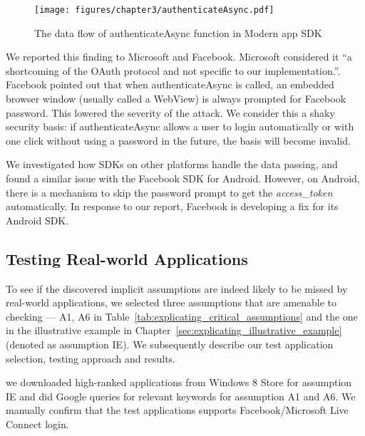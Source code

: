 \begin{figure}[hbt]
\centering
\texttt{[image: figures/chapter3/authenticateAsync.pdf]}
\caption{The data flow of authenticateAsync function in Modern app SDK}
\label{fig:authenticateAsync}
\end{figure}
 
We reported this finding to Microsoft and Facebook.  Microsoft considered it ``a shortcoming of the OAuth protocol and not specific to our implementation.''.  Facebook pointed out that when authenticateAsync is called, an embedded browser window (usually called a WebView) is always prompted for Facebook password.  This lowered the severity of the attack.  We consider this a shaky security basis: if authenticateAsync allows a user to login automatically or with one click without using a password in the future, the basis will become invalid. 

We investigated how SDKs on other platforms handle the data passing, and found a similar issue with the Facebook SDK for Android.  However, on Android, there is a mechanism to skip the password prompt to get the \emph{access\_token} automatically. In response to our report, Facebook is developing a fix for its Android SDK.

\subsection{Testing Real-world Applications}
\label{sec:explicating_test}

To see if the discovered implicit assumptions are indeed likely to be missed by real-world applications, we selected three assumptions that are amenable to checking --- A1, A6 in Table~\ref{tab:explicating_critical_assumptions} and the one in the illustrative example in Chapter~\ref{sec:explicating_illustrative_example} (denoted as assumption IE).  We subsequently describe our test application selection, testing approach and results.

 we downloaded high-ranked applications from Windows 8 Store for assumption IE and did Google queries for relevant keywords for assumption A1 and A6.  We manually confirm that the test applications supports Facebook/Microsoft Live Connect login.

